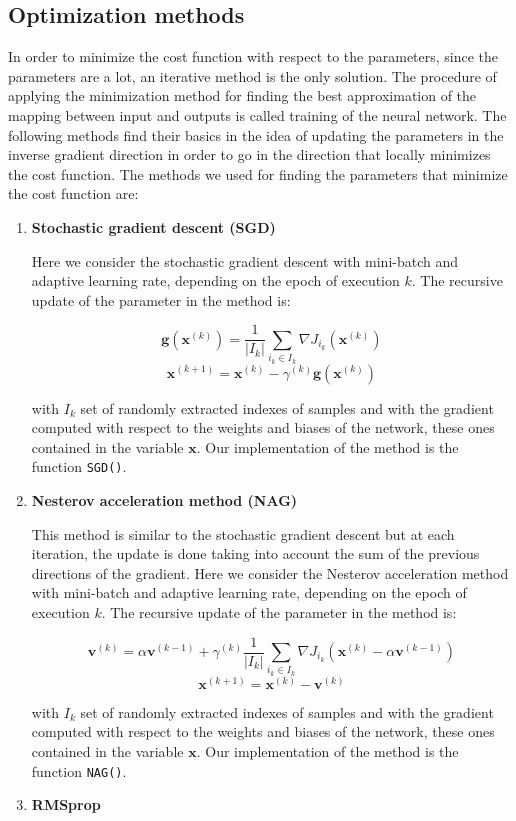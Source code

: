 \documentclass{Configuration_Files/PoliMi3i_thesis}
\begin{document}
\subsection{Optimization methods}
In order to minimize the cost function with respect to the parameters, since the parameters are a lot, an iterative method is the only solution. The procedure of applying the minimization method for finding the best approximation of the mapping between input and outputs is called training of the neural network.
The following methods find their basics in the idea of updating the parameters in the inverse gradient direction in order to go in the direction that locally minimizes the cost function.
The methods we used for finding the parameters that minimize the cost function are:
\begin{enumerate}
    \item \textbf{Stochastic gradient descent (SGD)}
    
    Here we consider the stochastic gradient descent with mini-batch and adaptive learning rate, depending on the epoch of execution $k$.
    The recursive update of the parameter in the method is:
    
    $$\mathbf{g}(\mathbf{x}^{(k)})=\frac{1}{|I_{k}|}\sum_{i_k \in I_k}{\nabla J_{i_{k}}(\mathbf{x}^{(k)})}$$
    $$\mathbf{x}^{(k+1)} = \mathbf{x}^{(k)}-\gamma^{(k)} \mathbf{g}(\mathbf{x}^{(k)})$$

    with $I_{k}$ set of randomly extracted indexes of samples and with the gradient computed with respect to the weights and biases of the network, these ones contained in the variable $\mathbf{x}$. Our implementation of the method is the function \verb|SGD()|.
    
    \item \textbf{Nesterov acceleration method (NAG)}
    
    This method is similar to the stochastic gradient descent but at each iteration, the update is done taking into account the sum of the previous directions of the gradient.
    Here we consider the Nesterov acceleration method with mini-batch and adaptive learning rate, depending on the epoch of execution $k$.
    The recursive update of the parameter in the method is:
    
    $$\mathbf{v}^{(k)} = \alpha \mathbf{v}^{(k-1)}+\gamma^{(k)} \frac{1}{|I_{k}|}\sum_{i_k \in I_k}{\nabla J_{i_{k}}(\mathbf{x}^{(k)}-\alpha \mathbf{v}^{(k-1)})}$$
    $$\mathbf{x}^{(k+1)} = \mathbf{x}^{(k)}-\mathbf{v}^{(k)}$$
    
    with $I_{k}$ set of randomly extracted indexes of samples and with the gradient computed with respect to the weights and biases of the network, these ones contained in the variable $\mathbf{x}$.
    Our implementation of the method is the function \verb|NAG()|.
    \item \textbf{RMSprop}
    

\end{enumerate}
\end{document}
